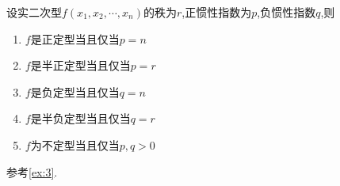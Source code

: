 \begin{formal}
    \begin{theorem}[正定型与负定型的规范标准型]\label{thm:正定型与负定型的规范标准型}
        设实二次型$f\left(
            x_1,x_2,\cdots,x_n
            \right)$的秩为$r$,正惯性指数为$p$,负惯性指数$q$,则\begin{enumerate}[label={\textup{(\arabic*)}}]
                \item $f$是正定型当且仅当$p=n$
                \item $f$是半正定型当且仅当$p=r$
                \item $f$是负定型当且仅当$q=n$
                \item $f$是半负定型当且仅当$q=r$
                \item $f$为不定型当且仅当$p,q>0$
            \end{enumerate}
    \end{theorem}
    \begin{Proof}
        参考\cref{ex:3}.
    \end{Proof}
\end{formal}
